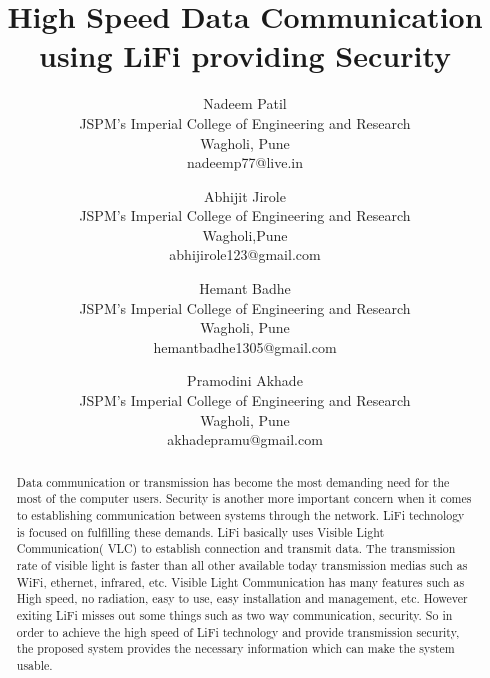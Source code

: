 \documentclass{ijcaArticle}
\begin{document}
\title{High Speed Data Communication using LiFi providing Security} %

\author{ 
   \large Nadeem Patil \\[-3pt]
   \normalsize JSPM's Imperial College of Engineering and Research  \\[-3pt]
    \normalsize Wagholi, Pune \\[-3pt]
    \normalsize	nadeemp77@live.in \\[-3pt]
  \and
   \large Abhijit Jirole \\[-3pt]
   \normalsize JSPM's Imperial College of Engineering and Research  \\[-3pt]
    \normalsize Wagholi,Pune \\[-3pt]
    \normalsize	abhijirole123@gmail.com \\[-3pt]
\and
   \large Hemant Badhe \\[-3pt]
   \normalsize JSPM's Imperial College of Engineering and Research  \\[-3pt]
    \normalsize Wagholi, Pune \\[-3pt]
    \normalsize	hemantbadhe1305@gmail.com \\[-3pt]
    \and
   \large Pramodini Akhade \\[-3pt]
   \normalsize JSPM's Imperial College of Engineering and Research  \\[-3pt]
    \normalsize Wagholi, Pune \\[-3pt]
    \normalsize	akhadepramu@gmail.com \\[-3pt]
}


\maketitle



\begin{abstract} 
Data communication or transmission has become the most demanding need
for the most of the computer users. Security is another more important concern when it
comes to establishing communication between systems through the network. LiFi technology
is focused on fulfilling these demands. LiFi basically uses Visible Light Communication(
VLC) to establish connection and transmit data. The transmission rate of
visible light is faster than all other available today transmission medias such as WiFi,
ethernet, infrared, etc. Visible Light Communication has many features such as High
speed, no radiation, easy to use, easy installation and management, etc. However exiting
LiFi misses out some things such as two way communication, security. So in order to
achieve the high speed of LiFi technology and provide transmission security, the proposed
system provides the necessary information which can make the system usable.
\end{abstract}
\end{document}
